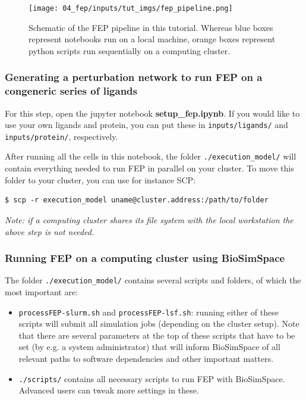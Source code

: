 \begin{figure}[htp]
\texttt{[image: 04\_fep/inputs/tut\_imgs/fep\_pipeline.png]}
\caption{Schematic of the FEP pipeline in this tutorial. Whereas blue boxes
represent notebooks run on a local machine, orange boxes represent
python scripts run sequentially on a computing cluster.}
\label{fep_pipeline_fig}
\end{figure}


\subsubsection{Generating a perturbation network to run FEP on a congeneric series of ligands}

For this step, open the jupyter notebook \textbf{setup\_fep.ipynb}. If
you would like to use your own ligands and protein, you can put these in
\texttt{inputs/ligands/} and \texttt{inputs/protein/}, respectively.

After running all the cells in this notebook, the folder
\texttt{./execution\_model/} will contain everything needed to run FEP
in parallel on your cluster. To move this folder to your cluster, you
can use for instance SCP:

\begin{lstlisting}
$ scp -r execution_model uname@cluster.address:/path/to/folder
\end{lstlisting}

\noindent \emph{Note: if a computing cluster shares its file system with the local workstation the above step is not needed.}


\subsubsection{Running FEP on a computing cluster using
BioSimSpace}

The folder \texttt{./execution\_model/} contains several scripts and
folders, of which the most important are:

\begin{itemize}
\item
  \texttt{processFEP-slurm.sh} and \texttt{processFEP-lsf.sh}: running
  either of these scripts will submit all simulation jobs (depending on the
  cluster setup). Note that there are several parameters at the top of
  these scripts that have to be set (by e.g. a system administrator)
  that will inform BioSimSpace of all relevant paths to software
  dependencies and other important matters.
\item
  \texttt{./scripts/} contains all necessary scripts to run FEP with
  BioSimSpace. Advanced users can tweak more settings in these.
\end{itemize}

